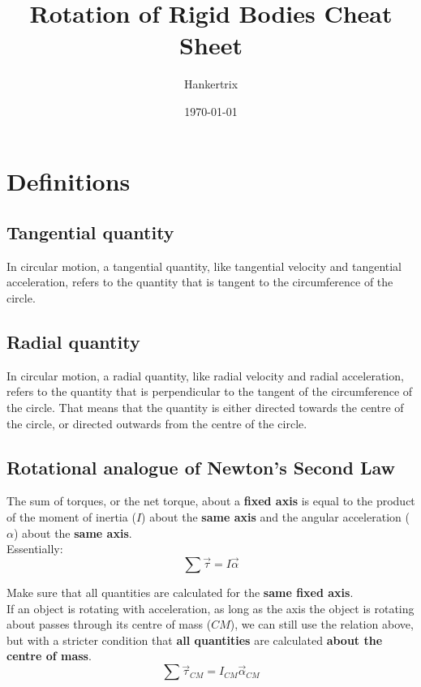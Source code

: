 \documentclass[11pt]{article}
\author{Hankertrix}
\date{\today}
\title{Rotation of Rigid Bodies Cheat Sheet}
\begin{document}
\maketitle
\setcounter{tocdepth}{2}
\tableofcontents

\newpage

\section{Definitions}
\label{sec:orge18b487}

\subsection{Tangential quantity}
\label{sec:org5943cf3}
In circular motion, a tangential quantity, like tangential velocity and tangential acceleration, refers to the quantity that is tangent to the circumference of the circle.

\subsection{Radial quantity}
\label{sec:orgf669a78}
In circular motion, a radial quantity, like radial velocity and radial acceleration, refers to the quantity that is perpendicular to the tangent of the circumference of the circle. That means that the quantity is either directed towards the centre of the circle, or directed outwards from the centre of the circle.

\subsection{Rotational analogue of Newton's Second Law}
\label{sec:org25c60f9}
The sum of torques, or the net torque, about a \textbf{fixed axis} is equal to the product of the moment of inertia (\(I\)) about the \textbf{same axis} and the angular acceleration (\(\alpha\)) about the \textbf{same axis}.
\\[0pt]

Essentially:
\[\sum \vec{\tau} = I \vec{\alpha}\]

Make sure that all quantities are calculated for the \textbf{same fixed axis}.
\\[0pt]

If an object is rotating with acceleration, as long as the axis the object is rotating about passes through its centre of mass (\(CM\)), we can still use the relation above, but with a stricter condition that \textbf{all quantities} are calculated \textbf{about the centre of mass}.
\[\sum \vec{\tau}_{CM} = I_{CM} \vec{\alpha}_{CM}\]
\end{document}
